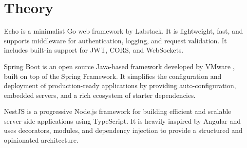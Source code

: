 \section{Theory}
Echo is a minimalist Go web framework by Labstack.
It is lightweight, fast, and supports middleware for authentication, logging, and request validation.
It includes built-in support for JWT, CORS, and WebSockets. \cite{bib:echo-framework}

Spring Boot is an open source Java-based framework developed by VMware \cite{bib:springboot-creator}, built on top of the Spring Framework.
It simplifies the configuration and deployment of production-ready applications by providing auto-configuration, embedded servers, and a rich ecosystem of starter dependencies. \cite{bib:spring-boot-framework}

NestJS is a progressive Node.js framework for building efficient and scalable server-side applications using TypeScript.
It is heavily inspired by Angular and uses decorators, modules, and dependency injection to provide a structured and opinionated architecture. \cite{bib:nestjs-framework}
